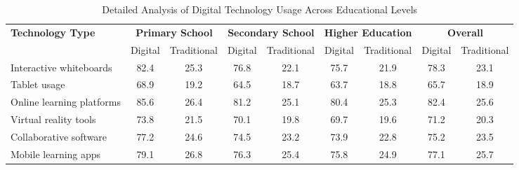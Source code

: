 \documentclass[12pt]{article}
\begin{document}
\begin{sectiontext}
\begin{table}[!ht]
    \centering
    \caption{Detailed Analysis of Digital Technology Usage Across Educational Levels}
    {\small
    \begin{tabular}{@{}l*{8}{c}@{}}
        \hline
        \multirow{2}{*}{\textbf{Technology Type}} & \multicolumn{2}{c}{\textbf{Primary School}} & \multicolumn{2}{c}{\textbf{Secondary School}} & \multicolumn{2}{c}{\textbf{Higher Education}} & \multicolumn{2}{c}{\textbf{Overall}} \\
        \cmidrule(lr){2-3} \cmidrule(lr){4-5} \cmidrule(lr){6-7} \cmidrule(lr){8-9}
        & Digital & Traditional & Digital & Traditional & Digital & Traditional & Digital & Traditional \\
        \hline
        Interactive whiteboards & 82.4 & 25.3 & 76.8 & 22.1 & 75.7 & 21.9 & 78.3 & 23.1 \\
        Tablet usage & 68.9 & 19.2 & 64.5 & 18.7 & 63.7 & 18.8 & 65.7 & 18.9 \\
        Online learning platforms & 85.6 & 26.4 & 81.2 & 25.1 & 80.4 & 25.3 & 82.4 & 25.6 \\
        Virtual reality tools & 73.8 & 21.5 & 70.1 & 19.8 & 69.7 & 19.6 & 71.2 & 20.3 \\
        Collaborative software & 77.2 & 24.6 & 74.5 & 23.2 & 73.9 & 22.8 & 75.2 & 23.5 \\
        Mobile learning apps & 79.1 & 26.8 & 76.3 & 25.4 & 75.8 & 24.9 & 77.1 & 25.7 \\
        \hline
    \end{tabular}
    }
    \label{tab:detailed_symptoms}
\end{table}

\end{sectiontext}
\end{document}
